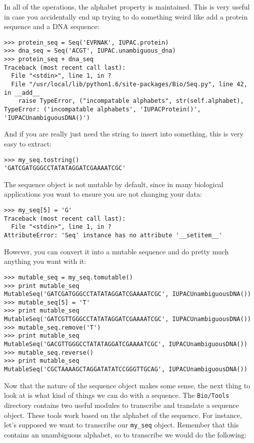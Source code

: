 \documentclass[dvips]{article}
\begin{document}
In all of the operations, the alphabet property is maintained. This is very useful in case you accidentally end up trying to do something weird like add a protein sequence and a DNA sequence:

\begin{verbatim}
>>> protein_seq = Seq('EVRNAK', IUPAC.protein)
>>> dna_seq = Seq('ACGT', IUPAC.unambiguous_dna)
>>> protein_seq + dna_seq
Traceback (most recent call last):
  File "<stdin>", line 1, in ?
  File "/usr/local/lib/python1.6/site-packages/Bio/Seq.py", line 42, in __add__
    raise TypeError, ("incompatable alphabets", str(self.alphabet),
TypeError: ('incompatable alphabets', 'IUPACProtein()', 'IUPACUnambiguousDNA()')
\end{verbatim}


And if you are really just need the string to insert into something, this is very easy to extract:

\begin{verbatim}
>>> my_seq.tostring()
'GATCGATGGGCCTATATAGGATCGAAAATCGC'
\end{verbatim} 

The sequence object is not mutable by default, since in many biological applications you want to ensure you are not changing your data:

\begin{verbatim}
>>> my_seq[5] = 'G'
Traceback (most recent call last):
  File "<stdin>", line 1, in ?
AttributeError: 'Seq' instance has no attribute '__setitem__'
\end{verbatim}

However, you can convert it into a mutable sequence and do pretty much anything you want with it:

\begin{verbatim}
>>> mutable_seq = my_seq.tomutable()
>>> print mutable_seq
MutableSeq('GATCGATGGGCCTATATAGGATCGAAAATCGC', IUPACUnambiguousDNA())
>>> mutable_seq[5] = 'T'
>>> print mutable_seq
MutableSeq('GATCGTTGGGCCTATATAGGATCGAAAATCGC', IUPACUnambiguousDNA())
>>> mutable_seq.remove('T')
>>> print mutable_seq
MutableSeq('GACGTTGGGCCTATATAGGATCGAAAATCGC', IUPACUnambiguousDNA())
>>> mutable_seq.reverse()
>>> print mutable_seq
MutableSeq('CGCTAAAAGCTAGGATATATCCGGGTTGCAG', IUPACUnambiguousDNA())
\end{verbatim}

Now that the nature of the sequence object makes some sense, the next thing to look at is what kind of things we can do with a sequence. The \verb|Bio/Tools| directory contains two useful modules to transcribe and translate a sequence object. These tools work based on the alphabet of the sequence. For instance, let's supposed we want to transcribe our \verb|my_seq| object. Remember that this contains an unambiguous alphabet, so to transcribe we would do the following:
\end{document}
